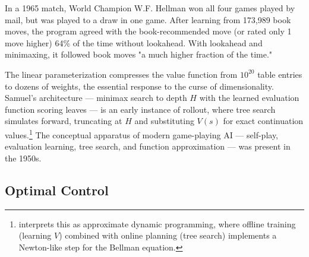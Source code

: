 In a 1965 match, World Champion W.F. Hellman won all four games played by mail, but was played to a draw in one game. After learning from 173,989 book moves, the program agreed with the book-recommended move (or rated only 1 move higher) 64\% of the time without lookahead. With lookahead and minimaxing, it followed book moves "a much higher fraction of the time."

The linear parameterization compresses the value function from $10^{20}$ table entries to dozens of weights, the essential response to the curse of dimensionality. Samuel's architecture — minimax search to depth $H$ with the learned evaluation function scoring leaves — is an early instance of rollout, where tree search simulates forward, truncating at $H$ and substituting $V(s)$ for exact continuation values.\footnote{\citet{bertsekas2021lessons} interprets this as approximate dynamic programming, where offline training (learning $V$) combined with online planning (tree search) implements a Newton-like step for the Bellman equation.} The conceptual apparatus of modern game-playing AI — self-play, evaluation learning, tree search, and function approximation — was present in the 1950s.

\subsection{Optimal Control}

